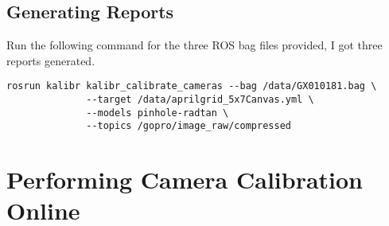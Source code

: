 \documentclass[11pt, oneside]{article}   	%
\begin{document}
\subsection{Generating Reports}
Run the following command for the three ROS bag files provided, I got three reports generated.
\begin{verbatim}
rosrun kalibr kalibr_calibrate_cameras --bag /data/GX010181.bag \
              --target /data/aprilgrid_5x7Canvas.yml \
              --models pinhole-radtan \
              --topics /gopro/image_raw/compressed
\end{verbatim}

\section{Performing Camera Calibration Online}
\end{document}
